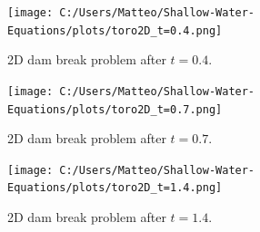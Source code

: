 \begin{figure}[H]
    \centering
    \texttt{[image: C:/Users/Matteo/Shallow-Water-Equations/plots/toro2D\_t=0.4.png]}
    \caption{2D dam break problem after $t=0.4$.}\label{fig:2D_dam_break_t0.4}
\end{figure}

\begin{figure}[H]
    \centering
    \texttt{[image: C:/Users/Matteo/Shallow-Water-Equations/plots/toro2D\_t=0.7.png]}
    \caption{2D dam break problem after $t=0.7$.}\label{fig:2D_dam_break_t0.7}
\end{figure}

\begin{figure}[H]
    \centering
    \texttt{[image: C:/Users/Matteo/Shallow-Water-Equations/plots/toro2D\_t=1.4.png]}
    \caption{2D dam break problem after $t=1.4$.}\label{fig:2D_dam_break_t1.4}
\end{figure}




